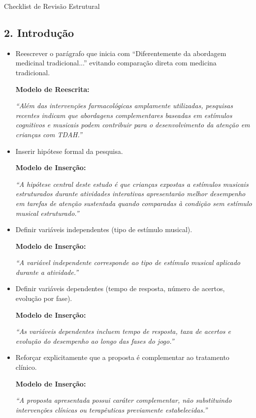 \documentclass[11pt,a4paper]{article}
\begin{document}
\begin{boxAvisos}{Checklist de Revisão Estrutural}
\subsection*{2. Introdução}

\begin{itemize}
    \item[$\boxtimes$] Reescrever o parágrafo que inicia com ``Diferentemente da abordagem medicinal tradicional...'' evitando comparação direta com medicina tradicional.
    
    \textbf{Modelo de Reescrita:}
    
    \textit{``Além das intervenções farmacológicas amplamente utilizadas, pesquisas recentes indicam que abordagens complementares baseadas em estímulos cognitivos e musicais podem contribuir para o desenvolvimento da atenção em crianças com TDAH.''}

    \item[$\boxtimes$] Inserir hipótese formal da pesquisa.
    
    \textbf{Modelo de Inserção:}
    
    \textit{``A hipótese central deste estudo é que crianças expostas a estímulos musicais estruturados durante atividades interativas apresentarão melhor desempenho em tarefas de atenção sustentada quando comparadas à condição sem estímulo musical estruturado.''}

    \item[$\boxtimes$] Definir variáveis independentes (tipo de estímulo musical).
    
    \textbf{Modelo de Inserção:}
    
    \textit{``A variável independente corresponde ao tipo de estímulo musical aplicado durante a atividade.''}

    \item[$\boxtimes$] Definir variáveis dependentes (tempo de resposta, número de acertos, evolução por fase).
    
    \textbf{Modelo de Inserção:}
    
    \textit{``As variáveis dependentes incluem tempo de resposta, taxa de acertos e evolução do desempenho ao longo das fases do jogo.''}

    \item[$\boxtimes$] Reforçar explicitamente que a proposta é complementar ao tratamento clínico.
    
    \textbf{Modelo de Inserção:}
    
    \textit{``A proposta apresentada possui caráter complementar, não substituindo intervenções clínicas ou terapêuticas previamente estabelecidas.''}
\end{itemize}


\end{boxAvisos}
\end{document}
